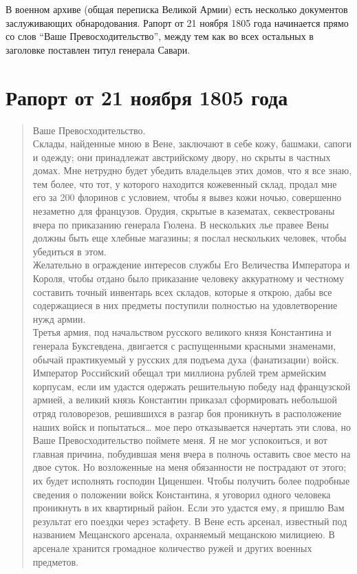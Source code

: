 \documentclass[
  oneside,
  12pt,
  titlepage]{book}
\begin{document}
В военном архиве (общая переписка Великой Армии) есть несколько документов заслуживающих обнародования. Рапорт от 21 ноября 1805 года начинается прямо со слов ``Ваше Превосходительство'', между тем как во всех остальных в заголовке поставлен титул генерала Савари.

\hypertarget{ux440ux430ux43fux43eux440ux442-ux43eux442-21-ux43dux43eux44fux431ux440ux44f-1805-ux433ux43eux434ux430}{%
\section{Рапорт от 21 ноября 1805 года}\label{ux440ux430ux43fux43eux440ux442-ux43eux442-21-ux43dux43eux44fux431ux440ux44f-1805-ux433ux43eux434ux430}}

\begin{quote}
Ваше Превосходительство.\\
Склады, найденные мною в Вене, заключают в себе кожу, башмаки, сапоги и одежду; они принадлежат австрийскому двору, но скрыты в частных домах. Мне нетрудно будет убедить владельцев этих домов, что я все знаю, тем более, что тот, у которого находится кожевенный склад, продал мне его за 200 флоринов с условием, чтобы я вывез кожи ночью, совершенно незаметно для французов. Орудия, скрытые в казематах, секвестрованы вчера по приказанию генерала Гюлена. В нескольких лье правее Вены должны быть еще хлебные магазины; я послал нескольких человек, чтобы убедиться в этом.\\
Желательно в ограждение интересов службы Его Величества Императора и Короля, чтобы отдано было приказание человеку аккуратному и честному составить точный инвентарь всех складов, которые я открою, дабы все содержащиеся в них предметы поступили полностью на удовлетворение нужд армии.\\
Третья армия, под начальством русского великого князя Константина и генерала Буксгевдена, двигается с распущенными красными знаменами, обычай практикуемый у русских для подъема духа (фанатизации) войск.\\
Император Российский обещал три миллиона рублей трем армейским корпусам, если им удастся одержать решительную победу над французской армией, а великий князь Константин приказал сформировать небольшой отряд головорезов, решившихся в разгар боя проникнуть в расположение наших войск и попытаться\ldots{} мое перо отказывается начертать эти слова, но Ваше Превосходительство поймете меня. Я не мог успокоиться, и вот главная причина, побудившая меня вчера в полночь оставить свое место на двое суток. Но возложенные на меня обязанности не пострадают от этого; их будет исполнять господин Циценшен. Чтобы получить более подробные сведения о положении войск Константина, я уговорил одного человека проникнуть в их квартирный район. Если это удастся ему, я пришлю Вам результат его поездки через эстафету. В Вене есть арсенал, известный под названием Мещанского арсенала, охраняемый мещанскою милициею. В арсенале хранится громадное количество ружей и других военных предметов.\\

\end{quote}
\end{document}
